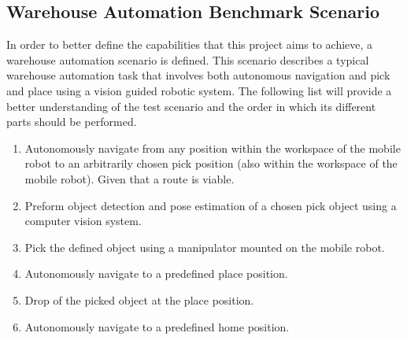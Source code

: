 \subsection{Warehouse Automation Benchmark Scenario} \label{sec:I:O:WarehouseScenario}
In order to better define the capabilities that this project aims to achieve, a warehouse automation scenario is defined. This scenario describes a typical warehouse automation task that involves both autonomous navigation and pick and place using a vision guided robotic system. The following list will provide a better understanding of the test scenario and the order in which its different parts should be performed.
\begin{enumerate}
    \item Autonomously navigate from any position within the workspace of the mobile robot to an arbitrarily chosen pick position (also within the workspace of the mobile robot). Given that a route is viable.
    \item Preform object detection and pose estimation of a chosen pick object using a computer vision system.
    \item Pick the defined object using a manipulator mounted on the mobile robot.
    \item Autonomously navigate to a predefined place position.
    \item Drop of the picked object at the place position.
    \item Autonomously navigate to a predefined home position.
\end{enumerate}





